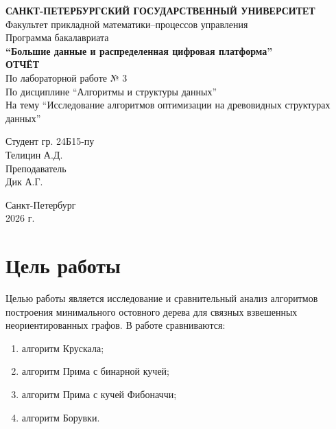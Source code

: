 \documentclass[12pt,a4paper]{article}
\begin{document}
\hypersetup{pageanchor=false}
\begin{titlepage}
  \centering
  {\large \textbf{САНКТ-ПЕТЕРБУРГСКИЙ ГОСУДАРСТВЕННЫЙ УНИВЕРСИТЕТ}} \\[0.5cm]
  {\large Факультет прикладной математики--процессов управления} \\[0.5cm]
  {\large Программа бакалавриата} \\[0.2cm]
  {\large \textbf{``Большие данные и распределенная цифровая платформа''}} \\[4.5cm]

  {\Large \textbf{ОТЧЁТ}} \\[0.3cm]
  {\large По лабораторной работе № 3} \\[0.2cm]
  {\large По дисциплине ``Алгоритмы и структуры данных''} \\[0.2cm]
  {\large На тему ``Исследование алгоритмов оптимизации на древовидных структурах данных''} \\[4cm]

  \begin{flushright}
    Студент гр. 24Б15-пу \\
    Телицин А.Д. \\[0.5cm]
    Преподаватель \\
    Дик А.Г. \\[1cm]
  \end{flushright}

  \vfill
  \centering
  Санкт-Петербург \\
  2026 г.
\end{titlepage}
\hypersetup{pageanchor=true}

\clearpage
{}

\tableofcontents
\newpage

\section{Цель работы}
\label{sec:goal}

Целью работы является исследование и сравнительный анализ алгоритмов построения минимального остовного дерева для связных взвешенных неориентированных графов. В работе сравниваются:
\begin{enumerate}
  \item алгоритм Крускала;
  \item алгоритм Прима с бинарной кучей;
  \item алгоритм Прима с кучей Фибоначчи;
  \item алгоритм Борувки.
\end{enumerate}
\end{document}
